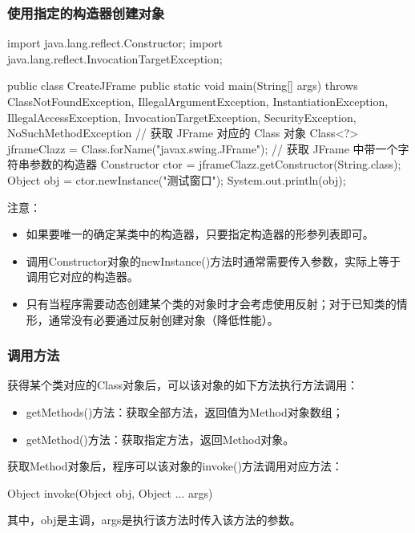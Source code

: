 \documentclass[hyperref={pdfpagelabels=false},compress,table]{beamer} %
\def\Red{\color{red}}
\begin{document}
\begin{frame}[fragile] %
\frametitle{使用指定的构造器创建对象}

\begin{javaCode}
import java.lang.reflect.Constructor;
import java.lang.reflect.InvocationTargetException;

public class CreateJFrame {
  public static void main(String[] args) throws ClassNotFoundException,
  IllegalArgumentException, InstantiationException,
  IllegalAccessException, InvocationTargetException,
  SecurityException, NoSuchMethodException {
    // 获取 JFrame 对应的 Class 对象
    Class<?> jframeClazz = Class.forName("javax.swing.JFrame");
    // 获取 JFrame 中带一个字符串参数的构造器
    Constructor ctor = jframeClazz.getConstructor(String.class);
    Object obj = ctor.newInstance("测试窗口");
    System.out.println(obj);
  }
}  
\end{javaCode}
注意：
\begin{itemize}\scriptsize
\item 如果要唯一的确定某类中的构造器，只要指定构造器的{\Red 形参列表}即可。
\item 调用Constructor对象的newInstance()方法时通常需要传入参数，实际上等于调用它对应的构造器。
\item 只有当程序需要动态创建某个类的对象时才会考虑使用反射；对于已知类的情形，通常没有必要通过反射创建对象（降低性能）。
\end{itemize}
\end{frame}

\begin{frame}[fragile] %
\frametitle{调用方法}

获得某个类对应的Class对象后，可以该对象的如下方法执行方法调用：
\begin{itemize}
\item getMethods()方法：获取全部方法，返回值为Method对象数组；
\item getMethod()方法：获取指定方法，返回Method对象。
\end{itemize}
获取Method对象后，程序可以该对象的invoke()方法调用对应方法：
\begin{javaCode}
Object invoke(Object obj, Object ... args)
\end{javaCode}
其中，obj是主调，args是执行该方法时传入该方法的参数。
\end{frame}
\end{document}
